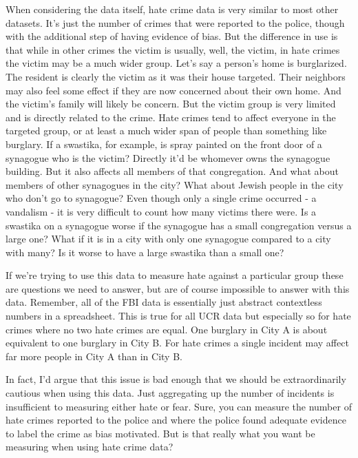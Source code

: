 \documentclass[
  12pt,
  openany]{book}
\begin{document}
When considering the data itself, hate crime data is very similar to most other datasets. It's just the number of crimes that were reported to the police, though with the additional step of having evidence of bias. But the difference in use is that while in other crimes the victim is usually, well, the victim, in hate crimes the victim may be a much wider group. Let's say a person's home is burglarized. The resident is clearly the victim as it was their house targeted. Their neighbors may also feel some effect if they are now concerned about their own home. And the victim's family will likely be concern. But the victim group is very limited and is directly related to the crime. Hate crimes tend to affect everyone in the targeted group, or at least a much wider span of people than something like burglary. If a swastika, for example, is spray painted on the front door of a synagogue who is the victim? Directly it'd be whomever owns the synagogue building. But it also affects all members of that congregation. And what about members of other synagogues in the city? What about Jewish people in the city who don't go to synagogue? Even though only a single crime occurred - a vandalism - it is very difficult to count how many victims there were. Is a swastika on a synagogue worse if the synagogue has a small congregation versus a large one? What if it is in a city with only one synagogue compared to a city with many? Is it worse to have a large swastika than a small one?

If we're trying to use this data to measure hate against a particular group these are questions we need to answer, but are of course impossible to answer with this data. Remember, all of the FBI data is essentially just abstract contextless numbers in a spreadsheet. This is true for all UCR data but especially so for hate crimes where no two hate crimes are equal. One burglary in City A is about equivalent to one burglary in City B. For hate crimes a single incident may affect far more people in City A than in City B.

In fact, I'd argue that this issue is bad enough that we should be extraordinarily cautious when using this data. Just aggregating up the number of incidents is insufficient to measuring either hate or fear. Sure, you can measure the number of hate crimes reported to the police and where the police found adequate evidence to label the crime as bias motivated. But is that really what you want be measuring when using hate crime data?
\end{document}
